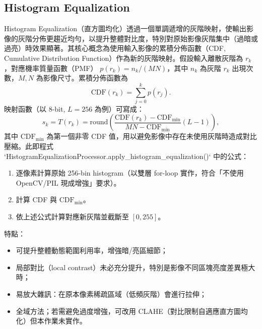 \documentclass[12pt,a4paper]{article}
\begin{document}
\subsection{Histogram Equalization}
Histogram Equalization（直方圖均化）透過一個單調遞增的灰階映射，使輸出影像的灰階分佈更趨近均勻，以提升整體對比度，特別對原始影像灰階集中（過暗或過亮）時效果顯著。其核心概念為使用輸入影像的累積分佈函數（CDF, Cumulative Distribution Function）作為新的灰階映射。假設輸入離散灰階為 \(r_k\)，對應機率質量函數（PMF） \(p(r_k) = n_k/(MN)\)，其中 \(n_k\) 為灰階 \(r_k\) 出現次數，\(M,N\) 為影像尺寸。累積分佈函數為
\[
\mathrm{CDF}(r_k) = \sum_{j=0}^{k} p(r_j).
\]
映射函數（以 8-bit, \(L=256\) 為例）可寫成：
\[
s_k = T(r_k) = \mathrm{round}\left( \frac{\mathrm{CDF}(r_k)-\mathrm{CDF}_{\min}}{MN-\mathrm{CDF}_{\min}} (L-1) \right),
\]
其中 \(\mathrm{CDF}_{\min}\) 為第一個非零 CDF 值，用以避免影像中存在未使用灰階時造成對比壓縮。此即程式 `HistogramEqualizationProcessor.apply_histogram_equalization()` 中的公式：
\begin{enumerate}[label=\alph*)]
  \item 逐像素計算原始 256-bin histogram（以雙層 for-loop 實作，符合「不使用 OpenCV/PIL 現成增強」要求）。
  \item 計算 CDF 與 \(\mathrm{CDF}_{\min}\)。
  \item 依上述公式計算對應新灰階並截斷至 \([0,255]\)。
\end{enumerate}
特點：
\begin{itemize}
  \item 可提升整體動態範圍利用率，增強暗/亮區細節；
  \item 局部對比（local contrast）未必充分提升，特別是影像不同區塊亮度差異極大時；
  \item 易放大雜訊：在原本像素稀疏區域（低頻灰階）會進行拉伸；
  \item 全域方法；若需避免過度增強，可改用 CLAHE（對比限制自適應直方圖均化）但本作業未實作。
\end{itemize}
\end{document}
